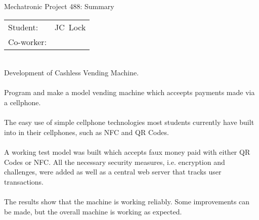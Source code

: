 
\begin{Summary}{Mechatronic Project 488: Summary}

   \noindent
   \begin{tabular}{@{}ll@{}}
      \textsf{Student:}    &  JC\ Lock\\
      \textsf{Co-worker:} &
   \end{tabular}

\begin{SumTable}
 \hline%
 \\
 \hline%
 Development of Cashless Vending Machine.
 \\

 \hline%
 \\
 \hline%
 Program and make a model vending machine which acceepts payments made via a cellphone.
 \\

 \hline%
 \\
 \hline%
 The easy use of simple cellphone technologies most students currently have built into in their
 cellphones, such as NFC and QR Codes.
 \\
   
 \hline%
 \\
 \hline%
 A working test model was built which accepts faux money paid with either QR Codes or NFC. All
 the necessary security measures, i.e. encryption and challenges, were added as well as a
 central web server that tracks user transactions.
 \\

 \hline%
 \\
 \hline%
 The results show that the machine is working reliably. Some improvements can be made, but the
 overall machine is working as expected.
 \\


\end{SumTable}
\end{Summary}
